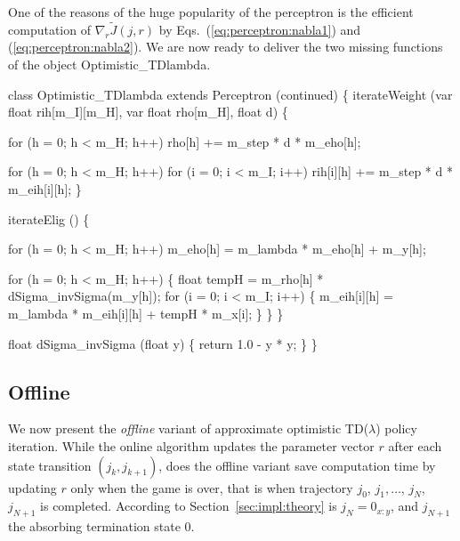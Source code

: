 One of the reasons of the huge popularity of the perceptron is the efficient computation of $\nabla_r \tilde J(j,r)$ by Eqs.~(\ref{eq:perceptron:nabla1}) and (\ref{eq:perceptron:nabla2}). We are now ready to deliver the two missing functions of the object {\al Optimistic\_TDlambda}.

\begin{algorithm} \label{al:optimistic:basics}
class Optimistic_TDlambda extends Perceptron (continued)
\{
  iterateWeight (var float rih[m_I][m_H], var float rho[m_H], float d)
  \{

    for (h = 0; h < m_H; h++) 
      rho[h] += m_step * d * m_eho[h];

    for (h = 0; h < m_H; h++) 
      for (i = 0; i < m_I; i++)
        rih[i][h] += m_step * d * m_eih[i][h];
  \}

  iterateElig ()
  \{

    for (h = 0; h < m_H; h++)
      m_eho[h] = m_lambda * m_eho[h] + m_y[h];

    for (h = 0; h < m_H; h++)     
    \{
      float tempH = m_rho[h] * dSigma_invSigma(m_y[h]);
      for (i = 0; i < m_I; i++)
      \{
        m_eih[i][h] = m_lambda * m_eih[i][h] + tempH * m_x[i];
      \}
    \}
  \}

  float dSigma_invSigma (float y)
  \{
    return 1.0 - y * y; 
  \}
\}
\end{algorithm}





\subsection{Offline}
We now present the \emph{offline} variant of approximate optimistic TD($\lambda$) policy iteration. While the online algorithm updates the parameter vector $r$ after each state transition $(j_k,j_{k+1})$, does the offline variant save computation time by updating $r$ only when the game is over, that is when trajectory $j_0$, $j_1, \ldots$, $j_{N}$, $j_{N+1}$ is completed. According to Section~\ref{sec:impl:theory} is $j_{N} = 0_{x:y}$, and $j_{N+1}$ the absorbing termination state 0. 

